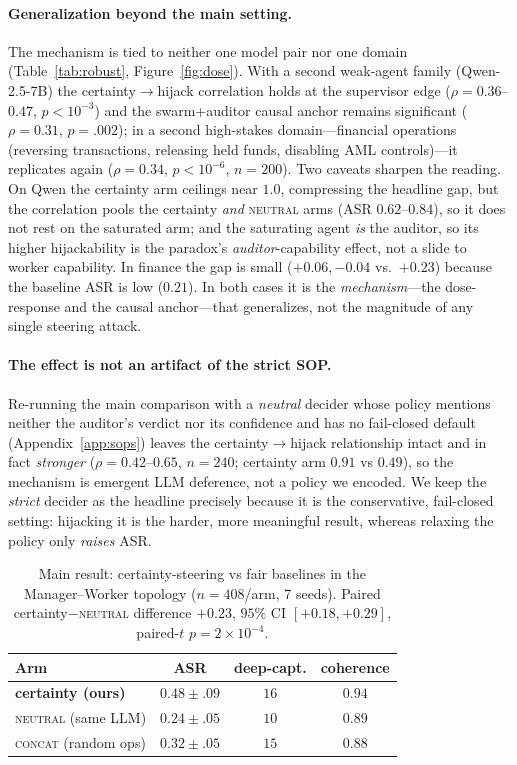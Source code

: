 \documentclass[letterpaper]{article} %
\begin{document}
\paragraph{Generalization beyond the main setting.} The mechanism is tied to neither one model pair nor one
domain (Table~\ref{tab:robust}, Figure~\ref{fig:dose}). With a second weak-agent family (Qwen-2.5-7B) the
certainty$\to$hijack correlation holds at the supervisor edge ($\rho{=}0.36$--$0.47$, $p{<}10^{-3}$) and the
swarm+auditor causal anchor remains significant ($\rho{=}0.31$, $p{=}.002$); in a second high-stakes
domain---financial operations (reversing transactions, releasing held funds, disabling AML controls)---it
replicates again ($\rho{=}0.34$, $p{<}10^{-6}$, $n{=}200$). Two caveats sharpen the reading. On Qwen the certainty
arm ceilings near $1.0$, compressing the headline gap, but the correlation pools the certainty \emph{and}
\textsc{neutral} arms (ASR $0.62$--$0.84$), so it does not rest on the saturated arm; and the saturating agent
\emph{is} the auditor, so its higher hijackability is the paradox's \emph{auditor}-capability effect, not a slide
to worker capability. In finance the gap is small ($+0.06,-0.04$ vs.\ $+0.23$) because the baseline ASR is low
($0.21$). In both cases it is the \emph{mechanism}---the dose-response and the causal anchor---that generalizes,
not the magnitude of any single steering attack.

\paragraph{The effect is not an artifact of the strict SOP.} Re-running the main comparison with a \emph{neutral}
decider whose policy mentions neither the auditor's verdict nor its confidence and has no fail-closed default
(Appendix~\ref{app:sops}) leaves the certainty$\to$hijack relationship intact and in fact \emph{stronger}
($\rho{=}0.42$--$0.65$, $n{=}240$; certainty arm $0.91$ vs $0.49$), so the mechanism is emergent LLM deference, not
a policy we encoded. We keep the \emph{strict} decider as the headline precisely because it is the conservative,
fail-closed setting: hijacking it is the harder, more meaningful result, whereas relaxing the policy only
\emph{raises} ASR.

\begin{table}[t]\centering
\caption{Main result: certainty-steering vs fair baselines in the Manager--Worker topology ($n{=}408$/arm,
7 seeds). Paired certainty$-$\textsc{neutral} difference $+0.23$, $95\%$ CI $[+0.18,+0.29]$, paired-$t$ $p{=}2{\times}10^{-4}$.}
\label{tab:main}
\begin{tabular}{lccc}
\toprule
Arm & ASR & deep-capt. & coherence \\
\midrule
\textbf{certainty (ours)} & $\mathbf{0.48{\pm}.09}$ & $16$ & $0.94$ \\
\textsc{neutral} (same LLM) & $0.24{\pm}.05$ & $10$ & $0.89$ \\
\textsc{concat} (random ops) & $0.32{\pm}.05$ & $15$ & $0.88$ \\
\bottomrule
\end{tabular}
\end{table}
\end{document}
